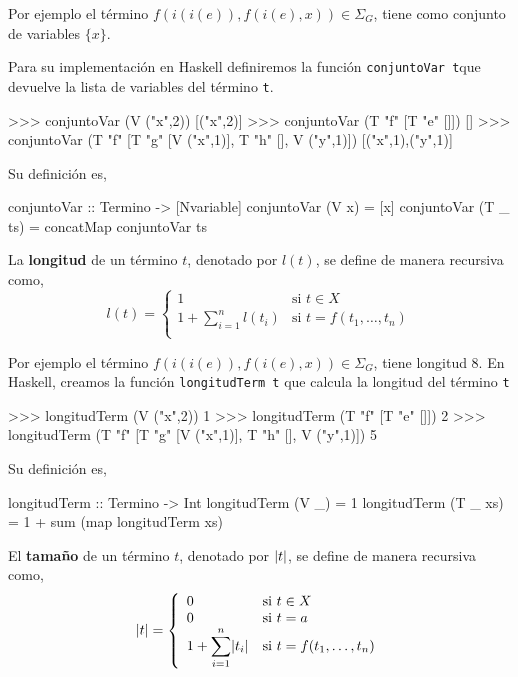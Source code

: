 Por ejemplo el término $f(i(i(e)),f(i(e),x)) \in \Sigma_G$, tiene como
conjunto de variables $\{x\}$.  

Para su implementación en Haskell definiremos la función
\texttt{conjuntoVar t}que devuelve la lista de variables del término
\texttt{t}.

\begin{sesion}
>>> conjuntoVar (V ("x",2))
[("x",2)]
>>> conjuntoVar (T "f" [T "e" []])
[]
>>> conjuntoVar (T "f" [T "g" [V ("x",1)], T "h" [], V ("y",1)])
[("x",1),("y",1)]
\end{sesion}

Su definición es,

\begin{codigo}
conjuntoVar :: Termino -> [Nvariable]
conjuntoVar (V x)    = [x]
conjuntoVar (T _ ts) = concatMap conjuntoVar ts
\end{codigo}

\begin{defi} La \textbf{longitud} de un término $t$, denotado por $l(t)$, se
  define de manera recursiva como,
  \begin{equation*}
    l(t)=
    \left\lbrace
      \begin{array}{ll}
        1 & \text{si } t \in X \\
        1 + \displaystyle \sum^n_{i=1} l(t_i) & \text{si } t = f(t_1, \dots, t_n)\\
      \end{array}
    \right.
  \end{equation*}
\end{defi}

Por ejemplo el término $f(i(i(e)),f(i(e),x)) \in \Sigma_G$, tiene
longitud 8.  
En Haskell, creamos la función \texttt{longitudTerm t} que
calcula la longitud del término \texttt{t}

\begin{sesion}
>>> longitudTerm (V ("x",2))
1
>>> longitudTerm (T "f" [T "e" []])
2
>>> longitudTerm (T "f" [T "g" [V ("x",1)], T "h" [], V ("y",1)])
5
\end{sesion}

Su definición es,

\begin{codigo}
longitudTerm :: Termino -> Int
longitudTerm (V _)    = 1
longitudTerm (T _ xs) = 1 + sum (map longitudTerm xs)
\end{codigo}

\begin{defi} El \textbf{tamaño} de un término $t$, denotado por $\lvert t\rvert $, se
  define de manera recursiva como,
  \begin{equation*}
    \lvert t\rvert=
    \left\lbrace
      \begin{array}{ll}
        0 & \text{si } t \in X \\
        0 & \text{si } t = a \\
        1 + \displaystyle \sum^n_{i=1} \lvert t_i\rvert & \text{si } t = f(t_1, \dots, t_n)\\
      \end{array}
    \right.
  \end{equation*}
\end{defi}

